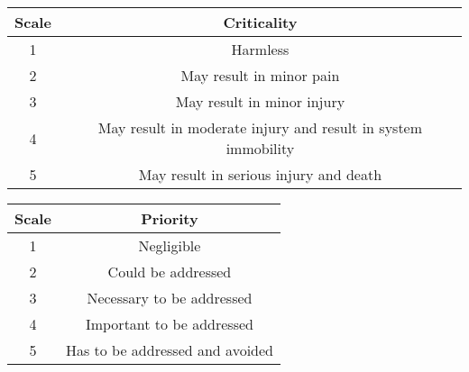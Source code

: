 \begin{center}
 \begin{tabular}{||c c ||}
 \hline
 Scale & Criticality \\ [0.5ex]
 \hline\hline
 1 & Harmless \\
 \hline
 2 & May result in minor pain \\
 \hline
 3 & May result in minor injury \\
 \hline
 4 & May result in moderate injury and result in system immobility \\
 \hline
 5 & May result in serious injury and death \\
 \hline 
\end{tabular}
\end{center}

\begin{center}
 \begin{tabular}{||c c ||}
 \hline
 Scale & Priority \\ [0.5ex]
 \hline\hline
 1 & Negligible \\
 \hline
 2 & Could be addressed \\
 \hline
 3 & Necessary to be addressed \\
 \hline
 4 & Important to be addressed \\
 \hline
 5 & Has to be addressed and avoided \\
 \hline 
\end{tabular}
\end{center}


